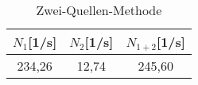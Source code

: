 \begin{table}[h]
	\begin{center}
		\begin{tabular}{ccc}
			$N_1$[1/s]&$N_2$[1/s]&$N_{1+2}$[1/s] \\ \hline
			234,26&12,74&245,60\\
		\end{tabular}
		\caption{Zwei-Quellen-Methode}
		\label{tabc2}
	\end{center}
\end{table}